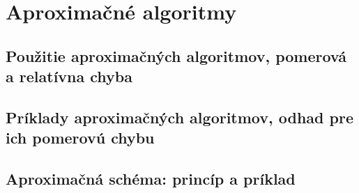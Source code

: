 \documentclass[../main.tex]{subfiles}
\begin{document}
\section{Aproximačné algoritmy}
\subsection{Použitie aproximačných algoritmov, pomerová a relatívna chyba}
\subsection{Príklady aproximačných algoritmov, odhad pre ich pomerovú chybu}
\subsection{Aproximačná schéma: princíp a príklad}
\end{document}
